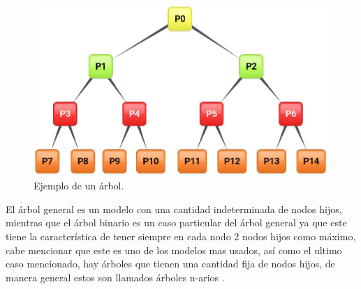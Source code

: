 \begin{figure}[h]
\centering
\includegraphics[width=0.8\columnwidth]{chap3/Imagenes/Arbol.eps}
\caption{Ejemplo de un \'arbol.}
\label{fig:iarbol}
\end{figure}

El \'arbol general es un modelo con una cantidad indeterminada de nodos hijos,
 mientras que el \'arbol binario es un caso particular del \'arbol general ya 
 que este tiene la caracter\'istica de tener siempre en cada nodo 2 nodos hijos 
 como m\'aximo, cabe mencionar que este es uno de los modelos mas usados, 
 as\'i como el ultimo caso mencionado, hay \'arboles que tienen una cantidad
 fija de nodos hijos, de manera general estos son llamados \'arboles n-arios
 \cite{gutierrez1999estructuras}.